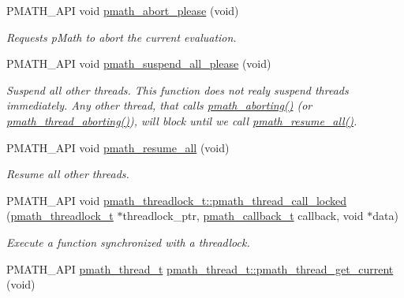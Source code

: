 \begin{CompactItemize}
PMATH\_\-API void \hyperlink{group__threads_g84e45036b76764def6390af12d2070bf}{pmath\_\-abort\_\-please} (void)
\begin{CompactList}\small\item\em Requests pMath to abort the current evaluation. \item\end{CompactList}\item 
\hypertarget{group__threads_g688141bacfb504b83dc319695f243b95}{
PMATH\_\-API void \hyperlink{group__threads_g688141bacfb504b83dc319695f243b95}{pmath\_\-suspend\_\-all\_\-please} (void)}
\label{group__threads_g688141bacfb504b83dc319695f243b95}

\begin{CompactList}\small\item\em Suspend all other threads. This function does not realy suspend threads immediately. Any other thread, that calls \hyperlink{group__threads_gb75a9c87401fddb42b297ddb0495415f}{pmath\_\-aborting()} (or \hyperlink{group__threads_g3932a5c364197c999dfab0aeb28e8779}{pmath\_\-thread\_\-aborting()}), will block until we call \hyperlink{group__threads_gccf30e13ea6e65136fca6294267f00c2}{pmath\_\-resume\_\-all()}. \item\end{CompactList}\item 
PMATH\_\-API void \hyperlink{group__threads_gccf30e13ea6e65136fca6294267f00c2}{pmath\_\-resume\_\-all} (void)
\begin{CompactList}\small\item\em Resume all other threads. \item\end{CompactList}\item 
PMATH\_\-API void \hyperlink{group__threads_gfcbd1d376791cb95a78e102366b7b79a}{pmath\_\-threadlock\_\-t::pmath\_\-thread\_\-call\_\-locked} (\hyperlink{classpmath__threadlock__t}{pmath\_\-threadlock\_\-t} $\ast$threadlock\_\-ptr, \hyperlink{group__general__types_ge1a454657f18f3cc54508adeccccbcbc}{pmath\_\-callback\_\-t} callback, void $\ast$data)
\begin{CompactList}\small\item\em Execute a function synchronized with a threadlock. \item\end{CompactList}\item 
PMATH\_\-API \hyperlink{classpmath__thread__t}{pmath\_\-thread\_\-t} \hyperlink{group__threads_g908b6ee94115539a20530cfb051dc52c}{pmath\_\-thread\_\-t::pmath\_\-thread\_\-get\_\-current} (void)

\end{CompactItemize}
